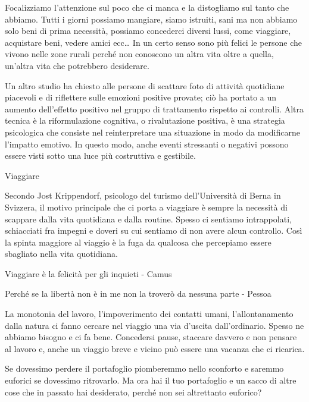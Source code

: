 \documentclass[12pt]{book} %
\begin{document}
Focalizziamo l'attenzione sul poco che ci manca e la distogliamo sul tanto che abbiamo. Tutti i
giorni possiamo mangiare, siamo istruiti, sani ma non abbiamo solo beni di prima necessità, possiamo concederci diversi
lussi, come viaggiare, acquistare beni, vedere amici ecc…
In un certo senso sono più felici le persone che vivono nelle zone rurali perché non conoscono un altra vita oltre a
quella, un'altra vita che potrebbero desiderare.

Un altro studio ha chiesto alle persone di scattare foto di attività quotidiane piacevoli e di riflettere sulle emozioni positive provate; ciò ha portato a un aumento dell'effetto positivo nel gruppo di trattamento rispetto ai controlli.
Altra tecnica è la riformulazione cognitiva, o rivalutazione positiva, è una strategia psicologica che consiste nel reinterpretare una situazione in modo da modificarne l’impatto emotivo. In questo modo, anche eventi stressanti o negativi possono essere visti sotto una luce più costruttiva e gestibile.

\begin{mdframed}[linewidth=1pt]
Viaggiare

Secondo Jost Krippendorf, psicologo del turismo dell'Università di Berna in Svizzera, il motivo principale che ci porta
a viaggiare è sempre la necessità di scappare dalla vita quotidiana e dalla routine. Spesso ci sentiamo intrappolati,
schiacciati fra impegni e doveri su cui sentiamo di non avere alcun controllo. Così la spinta maggiore al viaggio è la
fuga da qualcosa che percepiamo essere sbagliato nella vita quotidiana. 

Viaggiare è la felicità per gli inquieti - Camus

Perché se la libertà non è in me non la troverò da nessuna parte - Pessoa

La monotonia del lavoro, l'impoverimento dei contatti umani, l'allontanamento dalla natura ci fanno cercare nel viaggio
una via d'uscita dall'ordinario. Spesso ne abbiamo bisogno e ci fa bene. Concedersi pause, staccare davvero e non
pensare al lavoro e, anche un viaggio breve e vicino può essere una vacanza che ci ricarica. 
\end{mdframed}

Se dovessimo perdere il portafoglio piomberemmo nello sconforto e saremmo euforici se dovessimo ritrovarlo. Ma ora hai
il tuo portafoglio e un sacco di altre cose che in passato hai desiderato, perché non sei altrettanto euforico?
\end{document}
